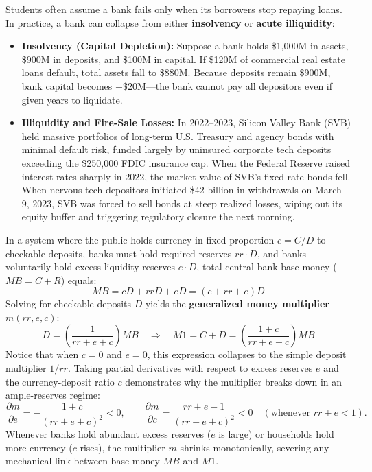 \documentclass[11pt, oneside]{book}
\begin{document}
\begin{clearitup}
Students often assume a bank fails only when its borrowers stop repaying loans. In practice, a bank can collapse from either \textbf{insolvency} or \textbf{acute illiquidity}:
\begin{itemize}[leftmargin=1.5em, itemsep=3pt]
  \item \textbf{Insolvency (Capital Depletion):} Suppose a bank holds \$1,000M in assets, \$900M in deposits, and \$100M in capital. If \$120M of commercial real estate loans default, total assets fall to \$880M. Because deposits remain \$900M, bank capital becomes $-\$20\text{M}$—the bank cannot pay all depositors even if given years to liquidate.
  \item \textbf{Illiquidity and Fire-Sale Losses:} In 2022–2023, Silicon Valley Bank (SVB) held massive portfolios of long-term U.S. Treasury and agency bonds with minimal default risk, funded largely by uninsured corporate tech deposits exceeding the \$250,000 FDIC insurance cap. When the Federal Reserve raised interest rates sharply in 2022, the market value of SVB's fixed-rate bonds fell. When nervous tech depositors initiated \$42 billion in withdrawals on March 9, 2023, SVB was forced to sell bonds at steep realized losses, wiping out its equity buffer and triggering regulatory closure the next morning.
\end{itemize}
\end{clearitup}

\begin{advancedbox}
In a system where the public holds currency in fixed proportion $c = C/D$ to checkable deposits, banks must hold required reserves $rr \cdot D$, and banks voluntarily hold excess liquidity reserves $e \cdot D$, total central bank base money ($MB = C + R$) equals:
\[
  MB = cD + rrD + eD = (c + rr + e)D
\]
Solving for checkable deposits $D$ yields the \textbf{generalized money multiplier} $m(rr, e, c)$:
\[
  D = \left(\frac{1}{rr + e + c}\right) MB \quad \Longrightarrow \quad M1 = C + D = \left(\frac{1 + c}{rr + e + c}\right) MB
\]
Notice that when $c = 0$ and $e = 0$, this expression collapses to the simple deposit multiplier $1/rr$. Taking partial derivatives with respect to excess reserves $e$ and the currency-deposit ratio $c$ demonstrates why the multiplier breaks down in an ample-reserves regime:
\[
  \frac{\partial m}{\partial e} = -\frac{1 + c}{(rr + e + c)^2} < 0, \qquad
  \frac{\partial m}{\partial c} = \frac{rr + e - 1}{(rr + e + c)^2} < 0 \quad (\text{whenever } rr + e < 1).
\]
Whenever banks hold abundant excess reserves ($e$ is large) or households hold more currency ($c$ rises), the multiplier $m$ shrinks monotonically, severing any mechanical link between base money $MB$ and $M1$.
\end{advancedbox}
\end{document}
